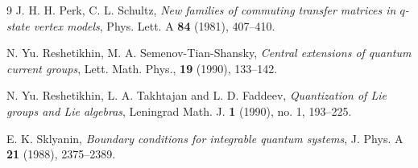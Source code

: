 \documentclass[12pt,a4paper,reqno]{amsart}
\theoremstyle{stil}
\theoremstyle{defi}
\theoremstyle{defi}
\theoremstyle{stil}
\theoremstyle{stil}
\theoremstyle{stil}
\theoremstyle{prim}
\begin{document}
\begin{thebibliography}{9}
J. H. H. Perk, C. L. Schultz,
{\em New families of commuting transfer matrices in $q$-state vertex models},
Phys. Lett. A \textbf{84} (1981), 407--410.

N. Yu. Reshetikhin, M. A. Semenov-Tian-Shansky,
{\em Central extensions of quantum current groups}, 
Lett. Math. Phys., {\bf 19} (1990), 133--142.

N. Yu. Reshetikhin, L. A. Takhtajan and L. D. Faddeev, 
{\em Quantization of Lie groups and Lie algebras}, 
Leningrad Math. J. \textbf{1} (1990), no. 1, 193--225.

E. K. Sklyanin, 
{\em Boundary conditions for integrable quantum systems}, 
J. Phys.
A \textbf{21} (1988), 2375--2389.
\end{thebibliography}


 

 
\end{document}
